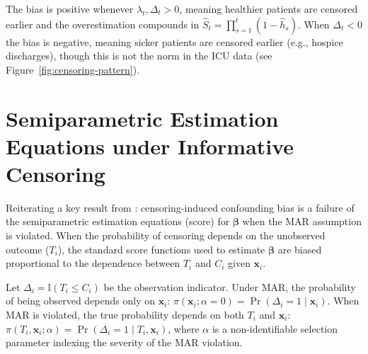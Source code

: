 \documentclass[twoside,11pt]{article}
\newcommand{\ind}{\mathbb{I}}
\newcommand{\bx}{\mathbf{x}}
\begin{document}
The bias is positive whenever $\lambda_t, \Delta_t > 0$, meaning healthier patients are censored earlier and the overestimation compounds in $\hat{S}_t = \prod_{s=1}^t (1 - \hat{h}_s)$. When $\Delta_t < 0$ the bias is negative, meaning sicker patients are censored earlier (e.g., hospice discharges), though this is not the norm in the ICU data (see Figure~\ref{fig:censoring-pattern}).

\section{Semiparametric Estimation Equations under Informative Censoring} \label{app:scharfstein1999}

Reiterating a key result from \citet{scharfstein1999}: censoring-induced confounding bias is a failure of the semiparametric estimation equations (score) for $\boldsymbol{\beta}$ when the MAR assumption is violated. When the probability of censoring depends on the unobserved outcome ($T_i$), the standard score functions used to estimate $\boldsymbol{\beta}$ are biased proportional to the dependence between $T_i$ and $C_i$ given $\bx_i$.

Let $\Delta_i = \ind(T_i \le C_i)$ be the observation indicator. Under MAR, the probability of being observed depends only on $\bx_i$: $\pi(\bx_i; \alpha = 0) = \Pr(\Delta_i = 1 \mid \bx_i)$. When MAR is violated, the true probability depends on both $T_i$ and $\bx_i$: $\pi(T_i, \bx_i; \alpha) = \Pr(\Delta_i = 1 \mid T_i, \bx_i)$, where $\alpha$ is a non-identifiable selection parameter indexing the severity of the MAR violation.
\end{document}
